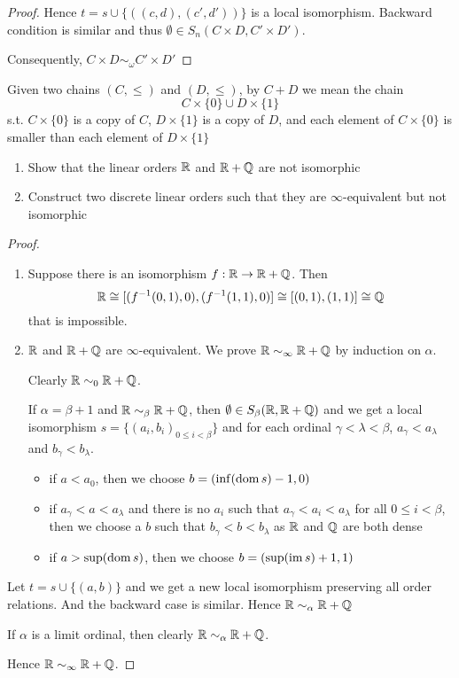 \documentclass[11pt]{article}
\begin{document}
\begin{proof}
Hence \(t=s\cup\{((c,d),(c',d'))\}\) is a local isomorphism. Backward condition is similar and thus
\(\emptyset\in S_n(C\times D,C'\times D')\).

Consequently, \(C\times D\sim_\omega C'\times D'\)
\end{proof}

\begin{exercise}
Given two chains \((C,\le)\) and \((D,\le)\), by \(C+D\) we mean the chain
\begin{equation*}
C\times\{0\}\cup D\times\{1\}
\end{equation*}
s.t. \(C\times\{0\}\) is a copy of \(C\), \(D\times\{1\}\) is a copy of \(D\), and each element of \(C\times\{0\}\) is
smaller than each element of \(D\times\{1\}\)
\begin{enumerate}
\item Show that the linear orders \(\mathbb{R}\) and \(\mathbb{R}+\mathbb{Q}\) are not isomorphic
\item Construct two discrete linear orders such that they are \(\infty\)-equivalent but not isomorphic
\end{enumerate}
\end{exercise}

\begin{proof}
\begin{enumerate}
\item Suppose there is an isomorphism \(f:\mathbb{R}\to\mathbb{R}+\mathbb{Q}\). Then
\begin{equation*}
 \mathbb{R}\cong[(f^{-1}(0,1),0),(f^{-1}(1,1),0)]\cong[(0,1),(1,1)]\cong\mathbb{Q}
\end{equation*}
that is impossible.
\item \(\mathbb{R}\) and \(\mathbb{R}+\mathbb{Q}\) are \(\infty\)-equivalent. We prove \(\mathbb{R}\sim_\infty\mathbb{R}+\mathbb{Q}\) by induction on \(\alpha\).

Clearly \(\mathbb{R}\sim_0\mathbb{R} +\mathbb{Q}\).

 If \(\alpha=\beta+1\) and \(\mathbb{R}\sim_\beta\mathbb{R} +\mathbb{Q}\), then \(\emptyset\in S_\beta(\mathbb{R},\mathbb{R} +\mathbb{Q})\) and we get a local
isomorphism \(s=\{(a_i,b_i)_{0\le i<\beta}\}\) and for each ordinal \(\gamma<\lambda<\beta\), \(a_\gamma<a_\lambda\) and \(b_\gamma<b_\lambda\).
\begin{itemize}
\item if \(a<a_0\), then we choose \(b=(\inf(\operatorname{dom} s)-1,0)\)
\item if \(a_{\gamma}<a<a_{\lambda}\) and there is no \(a_i\) such that \(a_\gamma<a_i<a_\lambda\) for all \(0\le i<\beta\), then we
choose a \(b\) such that \(b_\gamma<b<b_\lambda\) as \(\mathbb{R}\) and \(\mathbb{Q}\) are both dense
\item if \(a>\sup(\operatorname{dom} s)\), then we choose \(b=(\sup(\operatorname{im} s)+1,1)\)
\end{itemize}
\end{enumerate}


Let \(t=s\cup\{(a,b)\}\) and we get a new local isomorphism preserving all order relations. And the
backward case is similar.
Hence \(\mathbb{R}\sim_{\alpha}\mathbb{R}+\mathbb{Q}\)

If \(\alpha\) is a limit ordinal, then clearly \(\mathbb{R}\sim_\alpha\mathbb{R}+\mathbb{Q}\).

Hence \(\mathbb{R}\sim_\infty\mathbb{R}+\mathbb{Q}\).
\end{proof}
\end{document}
